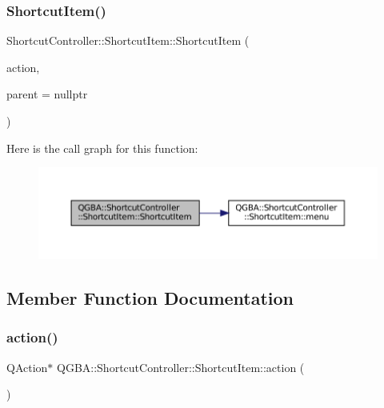 \subsubsection{\texorpdfstring{Shortcut\+Item()}{ShortcutItem()}\hspace{0.1cm}{\footnotesize\ttfamily [3/3]}}
{\footnotesize\ttfamily Shortcut\+Controller\+::\+Shortcut\+Item\+::\+Shortcut\+Item (\begin{DoxyParamCaption}\item[{Q\+Menu $\ast$}]{action,  }\item[{\mbox{\hyperlink{class_q_g_b_a_1_1_shortcut_controller_1_1_shortcut_item}{Shortcut\+Item}} $\ast$}]{parent = {\ttfamily nullptr} }\end{DoxyParamCaption})}

Here is the call graph for this function\+:
\nopagebreak
\begin{figure}[H]
\begin{center}
\leavevmode
\includegraphics[width=350pt]{class_q_g_b_a_1_1_shortcut_controller_1_1_shortcut_item_a03996b0c88ebe736b86226562859c512_cgraph}
\end{center}
\end{figure}


\subsection{Member Function Documentation}
\mbox{\label{class_q_g_b_a_1_1_shortcut_controller_1_1_shortcut_item_abd1d36951420bdfcfa6b2c249267de86}} 
\subsubsection{\texorpdfstring{action()}{action()}\hspace{0.1cm}{\footnotesize\ttfamily [1/2]}}
{\footnotesize\ttfamily Q\+Action$\ast$ Q\+G\+B\+A\+::\+Shortcut\+Controller\+::\+Shortcut\+Item\+::action (\begin{DoxyParamCaption}{ }\end{DoxyParamCaption})\hspace{0.3cm}{\ttfamily [inline]}}

